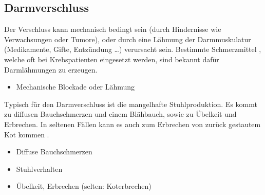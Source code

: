 % 
% 


\subsection{Darmverschluss}
\label{topic:ileus}


{%
Der Verschluss kann mechanisch bedingt sein (durch
Hindernisse wie Verwachsungen oder Tumore), oder durch eine
Lähmung der Darmmuskulatur (Medikamente, Gifte, Entzündung
\ldots) verursacht sein. Bestimmte Schmerzmittel
, welche oft bei Krebspatienten eingesetzt
werden, sind bekannt dafür Darmlähmungen zu erzeugen. 
}{%
\begin{itemize}
  \item Mechanische Blockade oder Lähmung
\end{itemize}
}{}{}{}


{%
Typisch für den Darmverschluss ist die mangelhafte
Stuhlproduktion. Es kommt zu diffusen Bauchschmerzen und einem
Blähbauch, sowie zu Übelkeit und Erbrechen. In seltenen
Fällen kann es auch zum Erbrechen von zurück
gestautem Kot kommen .

\bigskip
}{
\begin{itemize}
  \item Diffuse Bauchschmerzen
  \item Stuhlverhalten
  \item Übelkeit, Erbrechen (selten: Koterbrechen)
\end{itemize}
}{}{}{}



